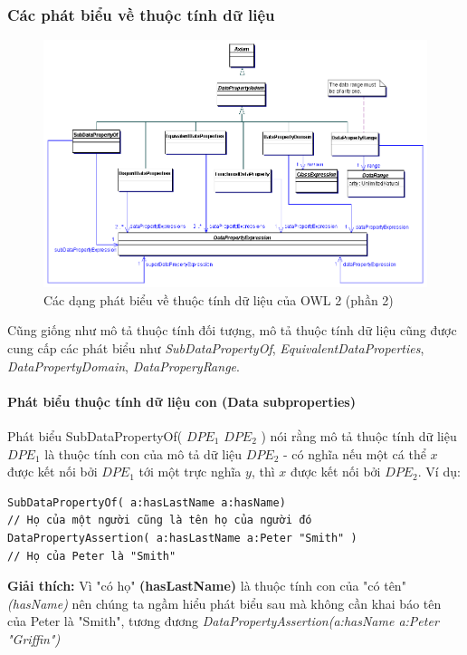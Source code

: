 \subsubsection{Các phát biểu về thuộc tính dữ liệu}
\begin{figure}[h]
	\centering
	\includegraphics[width=150mm]{Figures/datapropertyAxiom.png}
	\caption{Các dạng phát biểu về thuộc tính dữ liệu của OWL 2 (phần 2) \label{overflow}}
\end{figure}
Cũng giống như mô tả thuộc tính đối tượng, mô tả thuộc tính dữ liệu cũng được cung cấp các phát biểu như \textit{SubDataPropertyOf}, \textit{EquivalentDataProperties}, \textit{DataPropertyDomain}, \textit{DataProperyRange}.

\paragraph{Phát biểu thuộc tính dữ liệu con (Data subproperties)} Phát biểu SubDataPropertyOf( $DPE_{1}$ $DPE_{2}$ ) nói rằng mô tả thuộc tính dữ liệu $DPE_{1}$ là thuộc tính con của mô tả dữ liệu $DPE_{2}$ - có nghĩa nếu một cá thể $x$ được kết nối bởi $DPE_{1}$ tới một trực nghĩa $y$, thì $x$ được kết nối bởi $DPE_{2}$. Ví dụ:
\begin{verbatim}
SubDataPropertyOf( a:hasLastName a:hasName) 
// Họ của một người cũng là tên họ của người đó
DataPropertyAssertion( a:hasLastName a:Peter "Smith" )
// Họ của Peter là "Smith"
\end{verbatim}
\textbf{Giải thích:} Vì "có họ" \textbf{(hasLastName)} là thuộc tính con của "có tên" \textit{(hasName)} nên chúng ta ngầm hiểu phát biểu sau mà không cần khai báo tên của Peter là "Smith", tương đương \textit{DataPropertyAssertion(a:hasName a:Peter "Griffin")}


